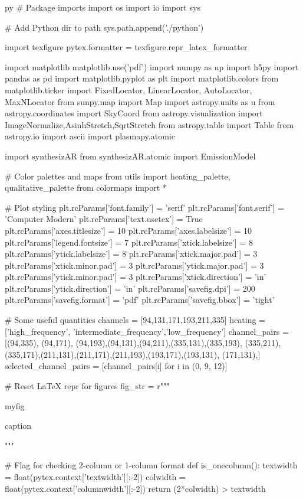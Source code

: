 \begin{pythontexcustomcode}{py}
# Package imports
import os
import io
import sys

# Add Python dir to path
sys.path.append('./python')

import texfigure
pytex.formatter = texfigure.repr_latex_formatter

import matplotlib
matplotlib.use('pdf')
import numpy as np
import h5py
import pandas as pd
import matplotlib.pyplot as plt
import matplotlib.colors
from matplotlib.ticker import FixedLocator, LinearLocator, AutoLocator, MaxNLocator
from sunpy.map import Map
import astropy.units as u
from astropy.coordinates import SkyCoord
from astropy.visualization import ImageNormalize,AsinhStretch,SqrtStretch
from astropy.table import Table
from astropy.io import ascii
import plasmapy.atomic

import synthesizAR
from synthesizAR.atomic import EmissionModel

# Color palettes and maps
from utils import heating_palette, qualitative_palette
from colormaps import *

# Plot styling
plt.rcParams['font.family'] = 'serif'
plt.rcParams['font.serif'] = 'Computer Modern'
plt.rcParams['text.usetex'] = True
plt.rcParams['axes.titlesize'] = 10
plt.rcParams['axes.labelsize'] = 10
plt.rcParams['legend.fontsize'] = 7
plt.rcParams['xtick.labelsize'] = 8
plt.rcParams['ytick.labelsize'] = 8
plt.rcParams['xtick.major.pad'] = 3
plt.rcParams['xtick.minor.pad'] = 3
plt.rcParams['ytick.major.pad'] = 3
plt.rcParams['ytick.minor.pad'] = 3
plt.rcParams['xtick.direction'] = 'in'
plt.rcParams['ytick.direction'] = 'in'
plt.rcParams['savefig.dpi'] = 200
plt.rcParams['savefig.format'] = 'pdf'
plt.rcParams['savefig.bbox'] = 'tight'

# Some useful quantities
channels = [94,131,171,193,211,335]
heating = ['high_frequency', 'intermediate_frequency','low_frequency']
channel_pairs = [(94,335), (94,171), (94,193),(94,131),(94,211),(335,131),(335,193),
					(335,211),(335,171),(211,131),(211,171),(211,193),(193,171),(193,131),
					(171,131),]
selected_channel_pairs = [channel_pairs[i] for i in (0, 9, 12)]

# Reset LaTeX repr for figures
fig_str = r"""
\begin{{{figure_env_name}}}
	\centering
	{myfig}
	\caption{{{caption}}}
	\label{{{label}}}
\end{{{figure_env_name}}}
"""

# Flag for checking 2-column or 1-column format
def is_onecolumn():
	textwidth = float(pytex.context['textwidth'][:-2])
	colwidth = float(pytex.context['columnwidth'][:-2])
	return (2*colwidth) > textwidth
\end{pythontexcustomcode}